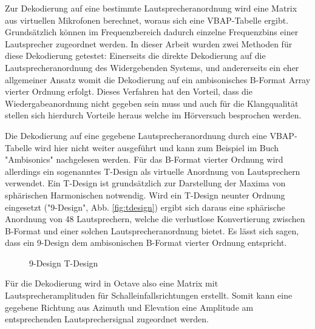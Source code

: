 Zur Dekodierung auf eine bestimmte Lautsprecheranordnung wird eine Matrix aus virtuellen Mikrofonen berechnet, woraus sich eine VBAP-Tabelle ergibt. Grundsätzlich können im Frequenzbereich dadurch einzelne Frequenzbins einer Lautsprecher zugeordnet werden. In dieser Arbeit wurden zwei Methoden für diese Dekodierung getestet: Einerseits die direkte Dekodierung auf die Lautsprecheranordnung des Widergebenden Systems, und andererseits ein eher allgemeiner Ansatz womit die Dekodierung auf ein ambisonisches B-Format Array vierter Ordnung erfolgt. Dieses Verfahren hat den Vorteil, dass die Wiedergabeanordnung nicht gegeben sein muss und auch für die Klangqualität stellen sich hierdurch Vorteile heraus welche im Hörversuch besprochen werden.

Die Dekodierung auf eine gegebene Lautsprecheranordnung durch eine VBAP-Tabelle wird hier nicht weiter ausgeführt und kann zum Beispiel im Buch "Ambisonics" nachgelesen werden. Für das B-Format vierter Ordnung wird allerdings ein sogenanntes T-Design als virtuelle Anordnung von Lautsprechern verwendet. Ein T-Design ist grundsätzlich zur Darstellung der Maxima von sphärischen Harmonischen notwendig. Wird ein T-Design neunter Ordnung eingesetzt ("9-Design", Abb. \ref{fig:tdesign}) ergibt sich daraus eine sphärische Anordnung von 48 Lautsprechern, welche die verlustlose Konvertierung zwischen B-Format und einer solchen Lautsprecheranordnung bietet. Es lässt sich sagen, dass ein 9-Design dem ambisonischen B-Format vierter Ordnung entspricht.

\begin{figure}
  \centering
  \caption{9-Design T-Design}
\end{figure}

Für die Dekodierung wird in Octave also eine Matrix mit Lautsprecheramplituden für Schalleinfallsrichtungen erstellt. Somit kann eine gegebene Richtung aus Azimuth und Elevation eine Amplitude am entsprechenden Lautsprechersignal zugeordnet werden.
